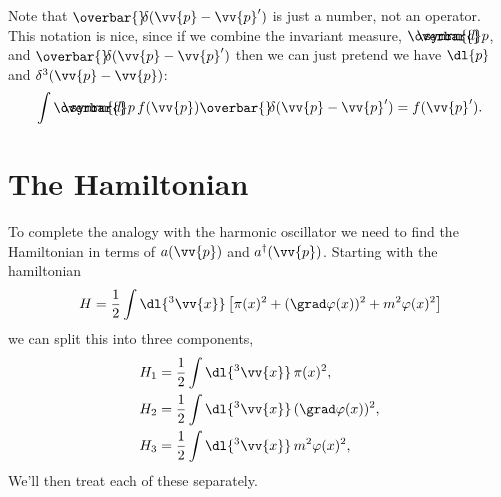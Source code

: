 \documentclass[fleqn]{NotesClass}
\newcommand{\hermit}{{\dagger}}
\newcommand\dbar{\ThisStyle{\ensurestackMath{%
            \stackengine{-.3\LMpt}{\SavedStyle \symrm{d}}{\SavedStyle\overbar{}%
                \mkern2.25mu}{O}{r}{F}{F}{L}}}}
\newcommand{\invariantmeasure}[1]{\dbar #1}
\newcommand\bardelta{\ThisStyle{\ensurestackMath{%
            \stackengine{-.3\LMpt}{\SavedStyle \delta}{\SavedStyle\overbar{}%
                \mkern4.5mu}{O}{r}{F}{F}{L}}}}
\begin{document}
    Note that \(\bardelta(\vv{p} - \vv{p}')\) is just a number, not an operator.
    This notation is nice, since if we combine the invariant measure, \(\invariantmeasure{p}\), and \(\bardelta(\vv{p} - \vv{p}')\) then we can just pretend we have \(\dl{p}\) and \(\delta^3(\vv{p} - \vv{p})\):
    \begin{equation}
        \int \invariantmeasure{p} \, f(\vv{p}) \bardelta(\vv{p} - \vv{p}') = f(\vv{p}').
    \end{equation}
    
    \section{The Hamiltonian}
    To complete the analogy with the harmonic oscillator we need to find the Hamiltonian in terms of \(a(\vv{p})\) and \(a^\hermit(\vv{p})\).
    Starting with the hamiltonian
    \begin{equation}
        H = \frac{1}{2} \int \dl{^3\vv{x}} \left[ \pi(x)^2 + (\grad \varphi(x))^2 + m^2 \varphi(x)^2 \right]
    \end{equation}
    we can split this into three components,
    \begin{align}
        H_1 &= \frac{1}{2}\int \dl{^3\vv{x}} \, \pi(x)^2,\\
        H_2 &= \frac{1}{2}\int \dl{^3\vv{x}} \, (\grad\varphi(x))^2,\\
        H_3 &= \frac{1}{2}\int \dl{^3\vv{x}} \, m^2\varphi(x)^2,\\
    \end{align}
    We'll then treat each of these separately.
    
\end{document}
